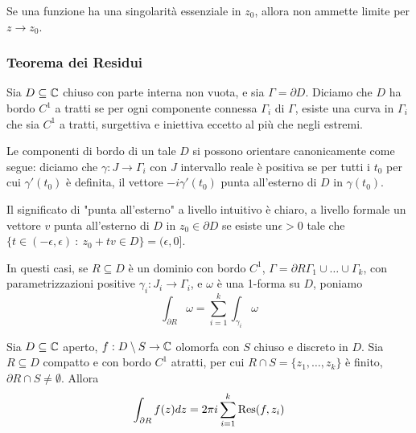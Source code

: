 \begin{oss}
    Se una funzione ha una singolarit\`a essenziale in $z_0$, allora non ammette
    limite per $z\rightarrow z_0$.
\end{oss}

\subsubsection{Teorema dei Residui}

\begin{defn}
    Sia $D\subseteq\mathbb{C}$ chiuso con parte interna non vuota, e sia
    $\Gamma=\partial D$. Diciamo che $D$ ha bordo $C^1$ a tratti se per ogni
    componente connessa $\Gamma_i$ di $\Gamma$, esiste una curva in $\Gamma_i$
    che sia $C^1$ a tratti, surgettiva e iniettiva eccetto al pi\`u che negli
    estremi.

    Le componenti di bordo di un tale $D$ si possono orientare canonicamente
    come segue: diciamo che $\gamma:J\rightarrow \Gamma_i$ con $J$ intervallo
    reale \`e positiva se per tutti i $t_0$ per cui $\gamma'(t_0)$ \`e definita,
    il vettore $-i\gamma'(t_0)$ punta all'esterno di $D$ in $\gamma(t_0)$.

    Il significato di "punta all'esterno" a livello intuitivo \`e chiaro, a
    livello formale un vettore $v$ punta all'esterno di $D$ in $z_0\in\partial D$ se
    esiste un$\epsilon>0$ tale che $\{t\in(-\epsilon,\epsilon) \ :\ z_0+tv\in D
    \} = (\epsilon,0]$.

    In questi casi, se $R\subseteq D$ \`e un dominio con bordo $C^1$, $\Gamma =
    \partial R  \Gamma_1 \cup \dots \cup \Gamma_k$, con parametrizzazioni
    positive $\gamma_i:J_i\rightarrow \Gamma_i$, e $\omega$ \`e una 1-forma su
    $D$, poniamo
    \[
        \int_{\partial R}\omega = \sum_{i=1}^k \int_{\gamma_i} \omega
    \]
\end{defn}

\begin{thm}
    Sia $D\subseteq \mathbb{C}$ aperto, $f:D\setminus S\rightarrow \mathbb{C}$ olomorfa con $S$
    chiuso e discreto in $D$. Sia $R\subseteq D$ compatto e con bordo $C^1$
    atratti, per cui $R\cap S = \{z_1,\dots,z_k\}$ \`e finito, $\partial R \cap
    S \neq \emptyset$. Allora
    \[
        \int_{\partial R} f(z)dz = 2 \pi i \sum_{i=1}^k \text{Res}(f,z_i)
    \]
\end{thm}

